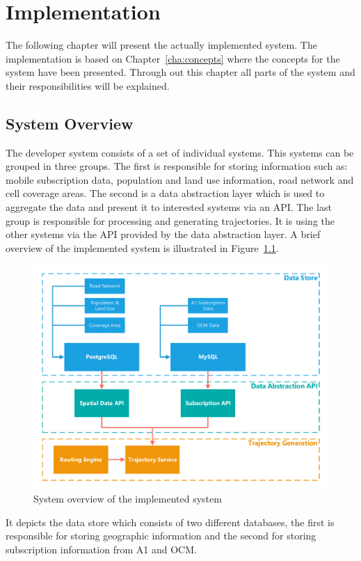 \chapter{Implementation}
\label{cha:implementation}
The following chapter will present the actually implemented system. The implementation is based on Chapter~\ref{cha:concepts} where the concepts for the system have been presented. Through out this chapter all parts of the system and their responsibilities will be explained.
\section{System Overview}
The developer system consists of a set of individual systems. This systems can be grouped in three groups. The first is responsible for storing information such as: mobile subscription data, population and land use information, road network and cell coverage areas. The second is a data abstraction layer which is used to aggregate the data and present it to interested systems via an API. The last group is responsible for processing and generating trajectories. It is using the other systems via the API provided by the data abstraction layer. A brief overview of the implemented system is illustrated in Figure~\ref{fig:systemoverview}.
\begin{figure}
\centering
\includegraphics[width=\linewidth]{./images/systemoverview}
\caption{System overview of the implemented system}
\label{fig:systemoverview}
\end{figure}
It depicts the data store which consists of two different databases, the first is responsible for storing geographic information and the second for storing subscription information from A1 and OCM.
